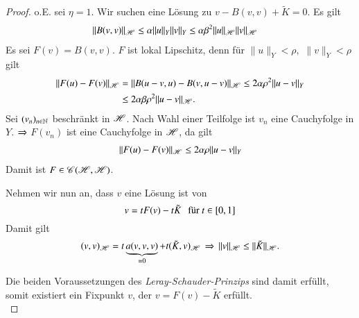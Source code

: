 \begin{proof}
    o.E. sei $\eta=1$. Wir suchen eine Lösung zu $v-B(v,v)+\tilde K=0$. Es gilt
    \begin{align*}
        \|B(v,v)\|_{\mathscr H}& \leq \alpha \|u\|_Y\|v\|_Y\leq \alpha \beta^2 \|u\|_{\mathscr H}\|v\|_{\mathscr H}
    \end{align*}
    Es sei $F(v)=B(v,v)$. $F$ ist lokal Lipschitz, denn für $\|u\|_Y< \rho,$ $\|v\|_Y<\rho$ gilt
    \begin{align*}
        \|F(u)-F(v)\|_{\mathscr H} &= \|B(u-v,u)-B(v,u-v)\|_{\mathscr H}\leq 2\alpha \rho^2 \|u-v\|_Y\\
            &\leq 2\alpha\beta \rho^2 \|u-v\|_{\mathscr H}.
    \end{align*}
    Sei $(v_n)_{n\in \mathbb{N}}$ beschränkt in $\mathscr H$. Nach Wahl einer Teilfolge ist $v_n$ eine Cauchyfolge
    in $Y$. $\Rightarrow$ $F(v_n)$ ist eine Cauchyfolge in $\mathscr H$, da gilt
    \begin{align*}
        \|F(u)-F(v)\|_{\mathscr H}\leq 2\alpha \rho\|u-v\|_Y
    \end{align*}
    Damit ist $F\in \mathscr C(\mathscr H,\mathscr H)$. 

    Nehmen wir nun an, dass $v$ eine Lösung ist von
    \[
        v=tF(v)-t\tilde K \hspace{.25cm} \text{für } t\in [0,1]
    \]
    Damit gilt
    \[
        (v,v)_{\mathscr H} = t\underbrace{a(v,v,v)}_{=0} + t(\tilde K, v)_{\mathscr H} \, \Rightarrow \,
        \|v\|_{\mathscr H}\leq \|\tilde K\|_{\mathscr H}.
    \]

    Die beiden Voraussetzungen des \textit{Leray-Schauder-Prinzips} sind damit erfüllt,
    somit existiert ein Fixpunkt $v$, der $ v=F(v)-\tilde K$ erfüllt. \[ \]
\end{proof}
